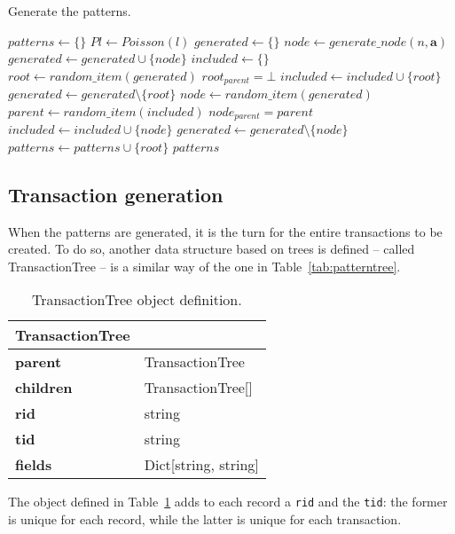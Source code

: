 \documentclass{acm_proc_article-sp-sigmod09}
\begin{document}
\begin{algorithm}
\caption{Generate the patterns.}
\label{generate_patterns}
\begin{algorithmic}[1]
\State $patterns \gets \{\}$
	\State $Pl \gets Poisson(l)$
	\State $generated \gets \{\}$
		\State $node \gets generate\_node(n, \boldsymbol{a}) $ 
		\State $generated \gets generated \cup \{node\}$
	\EndFor
	\State $included \gets \{\}$
	\State $root \gets random\_item(generated)$
	\State $root_{parent} = \bot$
	\State $included \gets included \cup \{root\}$
	\State $generated \gets generated \setminus \{root\}$
		\State $node \gets random\_item(generated)$
		\State $parent \gets random\_item(included)$
		\State $node_{parent} = parent$
		\State $included \gets included \cup \{node\}$
		\State $generated \gets generated \setminus \{node\}$
	\EndFor
	\State $patterns \gets patterns \cup \{root\}$
\EndFor
\Return $patterns$
\EndFunction
\end{algorithmic}
\end{algorithm}

\subsection{Transaction generation}
When the patterns are generated, it is the turn for the entire transactions to be created. To do so, another data structure based on trees is defined -- called TransactionTree -- is a similar way of the one in Table~\ref{tab:patterntree}.

\begin{table}[H]
\centering
\begin{tabular}{|ll|} \hline
\textbf{TransactionTree} & \\ \hline
\textbf{parent} & TransactionTree \\ \hline
\textbf{children} & TransactionTree[] \\ \hline
\textbf{rid} & string \\ \hline
\textbf{tid} & string \\ \hline
\textbf{fields} & Dict[string, string] \\
\hline\end{tabular}
\caption{TransactionTree object definition.}
\label{tab:transactiontree}
\end{table}

The object defined in Table~\ref{tab:transactiontree} adds to each record a \texttt{rid} and the \texttt{tid}: the former is unique for each record, while the latter is unique for each transaction.
\end{document}
